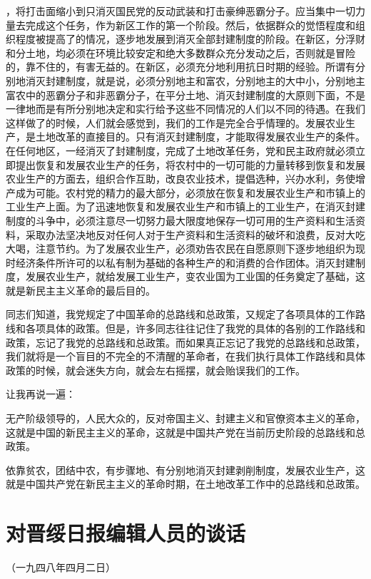 \documentclass[UTF-8, a5paper, 12pt]{ctexart}
\begin{document}
，将打击面缩小到只消灭国民党的反动武装和打击豪绅恶霸分子。应当集中一切力量去完成这个任务，作为新区工作的第一个阶段。然后，依据群众的觉悟程度和组织程度被提高了的情况，逐步地发展到消灭全部封建制度的阶段。在新区，分浮财和分土地，均必须在环境比较安定和绝大多数群众充分发动之后，否则就是冒险的，靠不住的，有害无益的。在新区，必须充分地利用抗日时期的经验。所谓有分别地消灭封建制度，就是说，必须分别地主和富农，分别地主的大中小，分别地主富农中的恶霸分子和非恶霸分子，在平分土地、消灭封建制度的大原则下面，不是一律地而是有所分别地决定和实行给予这些不同情况的人们以不同的待遇。在我们这样做了的时候，人们就会感觉到，我们的工作是完全合乎情理的。发展农业生产，是土地改革的直接目的。只有消灭封建制度，才能取得发展农业生产的条件。在任何地区，一经消灭了封建制度，完成了土地改革任务，党和民主政府就必须立即提出恢复和发展农业生产的任务，将农村中的一切可能的力量转移到恢复和发展农业生产的方面去，组织合作互助，改良农业技术，提倡选种，兴办水利，务使增产成为可能。农村党的精力的最大部分，必须放在恢复和发展农业生产和市镇上的工业生产上面。为了迅速地恢复和发展农业生产和市镇上的工业生产，在消灭封建制度的斗争中，必须注意尽一切努力最大限度地保存一切可用的生产资料和生活资料，采取办法坚决地反对任何人对于生产资料和生活资料的破坏和浪费，反对大吃大喝，注意节约。为了发展农业生产，必须劝告农民在自愿原则下逐步地组织为现时经济条件所许可的以私有制为基础的各种生产的和消费的合作团体。消灭封建制度，发展农业生产，就给发展工业生产，变农业国为工业国的任务奠定了基础，这就是新民主主义革命的最后目的。

同志们知道，我党规定了中国革命的总路线和总政策，又规定了各项具体的工作路线和各项具体的政策。但是，许多同志往往记住了我党的具体的各别的工作路线和政策，忘记了我党的总路线和总政策。而如果真正忘记了我党的总路线和总政策，我们就将是一个盲目的不完全的不清醒的革命者，在我们执行具体工作路线和具体政策的时候，就会迷失方向，就会左右摇摆，就会贻误我们的工作。

让我再说一遍：

无产阶级领导的，人民大众的，反对帝国主义、封建主义和官僚资本主义的革命，这就是中国的新民主主义的革命，这就是中国共产党在当前历史阶段的总路线和总政策。

依靠贫农，团结中农，有步骤地、有分别地消灭封建剥削制度，发展农业生产，这就是中国共产党在新民主主义的革命时期，在土地改革工作中的总路线和总政策。

\section{对晋绥日报编辑人员的谈话}

（一九四八年四月二日）
\end{document}

